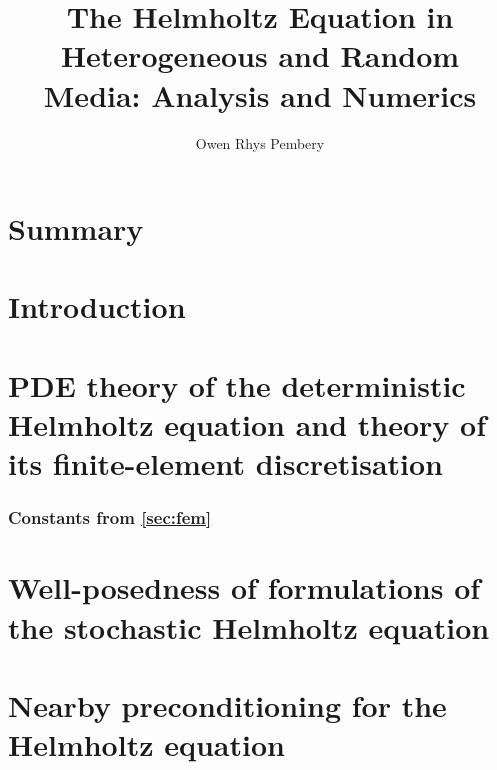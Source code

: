 \documentclass{report}
\title{The Helmholtz Equation in Heterogeneous and Random Media: Analysis and Numerics}
\author{Owen Rhys Pembery}
\begin{document}
\maketitle



\chapter*{Summary}



\tableofcontents



\chapter{Introduction}\label{chap:intro}


\chapter{PDE theory of the deterministic Helmholtz equation and theory of its finite-element discretisation}\label{chap:background}




\subsection{Constants from \cref{sec:fem}}\label{app:constants}


%

%

\chapter{Well-posedness of formulations of the stochastic Helmholtz equation}\label{chap:stochastic}
 
















\chapter{Nearby preconditioning for the Helmholtz equation}\label{chap:nbpc}

\end{document}
